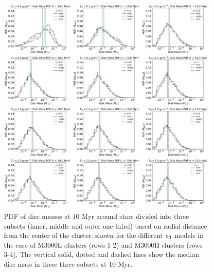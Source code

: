 \documentclass[fleqn,usenatbib]{mnras}
\newcommand\sfeff{\ensuremath{\epsilon_{\rm ff}}\xspace}   %
\begin{document}
\begin{figure}%
    \centering
    \includegraphics[width=\textwidth]{figures/RadialProfile_DiscMass.pdf}
    \caption{PDF of disc masses at 10 Myr around stars divided into three subsets (inner, middle and outer one-third) based on radial distance from the center of the cluster, shown for the different \sfeff models in the case of M3000L clusters (rows 1-2) and M3000H clusters (rows 3-4). The vertical solid, dotted and dashed lines show the median disc mass in these three subsets at 10 Myr.}
    \label{fig:radialprofilediskmass}
\end{figure}
\end{document}
